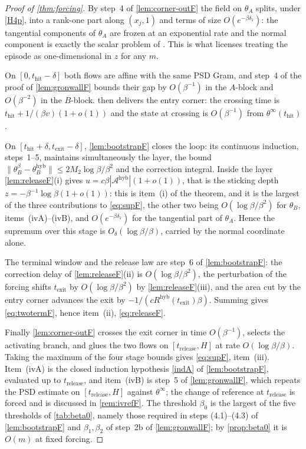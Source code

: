\documentclass[11pt]{article}
\theoremstyle{definition}
\theoremstyle{remark}
\newcommand{\thit}{t_{\mathrm{hit}}}
\newcommand{\texit}{t_{\mathrm{exit}}}
\newcommand{\trel}{t_{\mathrm{release}}}
\newcommand{\Ar}{\mathcal{A}}                      %
\newcommand{\hyb}{\mathrm{hyb}}
\begin{document}
\begin{proof}[Proof of \cref{thm:forcing}]
By step~4 of \cref{lem:corner-outF} the field on $\theta_A$ splits, under
\eqref{H4p}, into a rank-one part along $(x_j,1)$ and terms of size
$O(e^{-\beta\delta_1})$: the tangential components of $\theta_A$ are frozen at
an exponential rate and the normal component is exactly the scalar problem of
. This is what licenses treating the
episode as one-dimensional in $z$ for any $m$.

On $[0,\thit-\delta]$ both flows are affine with the same PSD Gram, and step~4
of the proof of \cref{lem:gronwallF} bounds their gap by $O(\beta^{-1})$ in the
$A$-block and $O(\beta^{-2})$ in the $B$-block.  then
delivers the entry corner: the crossing time is $\thit+1/(\beta v)(1+o(1))$ and
the state at crossing is $O(\beta^{-1})$ from $\theta^\infty(\thit)$.

On $[\thit+\delta,\texit-\delta]$, \cref{lem:bootstrapF} closes the loop: its
continuous induction, steps~1--5, maintains simultaneously the layer, the bound
$\|\theta_B^\beta-\theta_B^{\hyb}\|\le2M_2\log\beta/\beta^2$ and the correction
integral. Inside the layer \cref{lem:releaseF}(i) gives
$u=c\beta|\Ar^{\hyb}|(1+o(1))$, that is the sticking depth
$z=-\beta^{-1}\log\beta(1+o(1))$: this is item~(i) of the theorem, and it is the
largest of the three contributions to \eqref{eq:supF}, the other two being
$O(\log\beta/\beta^2)$ for $\theta_B$, items~(ivA)--(ivB), and
$O(e^{-\beta\delta_1})$ for the tangential part of $\theta_A$. Hence the
supremum over this stage is $O_\delta(\log\beta/\beta)$, carried by the normal
coordinate alone.

The terminal window and the release law are step~6 of \cref{lem:bootstrapF}: the
correction delay of \cref{lem:releaseF}(ii) is $O(\log\beta/\beta^2)$, the
perturbation of the forcing shifts $\texit$ by $O(\log\beta/\beta^2)$ by
\cref{lem:releaseF}(iii), and the area cut by the entry corner advances the exit
by $-1/(cR^{\hyb}(\texit)\beta)$. Summing gives \eqref{eq:twotermF}, hence
item~(ii), \eqref{eq:releaseF}.

Finally \cref{lem:corner-outF} crosses the exit corner in time $O(\beta^{-1})$,
selects the activating branch, and glues the two flows on $[\trel,H]$ at rate
$O(\log\beta/\beta)$. Taking the maximum of the four stage bounds gives
\eqref{eq:supF}, item~(iii). Item~(ivA) is the closed induction hypothesis
\eqref{indA} of \cref{lem:bootstrapF}, evaluated up to $\trel$, and item~(ivB)
is step~5 of \cref{lem:gronwallF}, which repeats the PSD estimate on
$[\trel,H]$ against $\theta^\infty$; the change of reference at $\trel$ is
forced and is discussed in \cref{rem:ivrefF}. The threshold $\beta_0$ is the
largest of the five thresholds of \cref{tab:beta0}, namely those required in
steps (4.1)--(4.3) of \cref{lem:bootstrapF} and $\beta_1,\beta_2$ of step~2b of
\cref{lem:gronwallF}; by \cref{prop:beta0} it is $O(m)$ at fixed forcing.
\end{proof}
\end{document}
